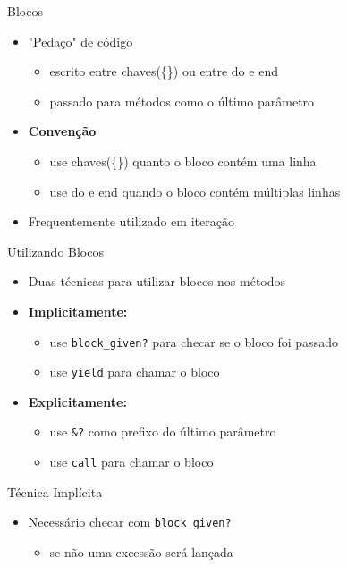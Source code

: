 
\begin{frame}{Blocos}
  \begin{itemize}
    \item "Pedaço" de código
    \begin{itemize}
      \item escrito entre chaves(\{\}) ou entre \alert{do} e \alert{end}
      \item passado para métodos como o \alert{último} parâmetro
    \end{itemize}
    \item \textbf{Convenção} 
    \begin{itemize}
      \item use chaves(\{\}) quanto o bloco contém uma linha
      \item use \alert{do} e \alert{end} quando o bloco contém múltiplas linhas
    \end{itemize}
    \item Frequentemente utilizado em \alert{iteração}
  \end{itemize}
  
  
    
\end{frame}

\begin{frame}[fragile,t]{Utilizando Blocos}
  \begin{itemize}
    \item Duas técnicas para utilizar blocos nos métodos
    \item \textbf{Implicitamente:}
    \begin{itemize}
      \item use \verb!block_given?! para checar se o bloco foi passado
      \item use \verb!yield! para \alert{chamar} o bloco
    \end{itemize}
    \item \textbf{Explicitamente:}
    \begin{itemize}
      \item use \verb!&?! como prefixo do último parâmetro
      \item use \verb!call! para \alert{chamar} o bloco
    \end{itemize} 
  \end{itemize}   
\end{frame}

\begin{frame}[fragile,t]{Técnica Implícita}
  \begin{itemize}
    \item Necessário checar com \verb!block_given?! 
    \begin{itemize}
    	\item se não uma excessão será lançada
    \end{itemize}
    
	
  \end{itemize}   
\end{frame}

